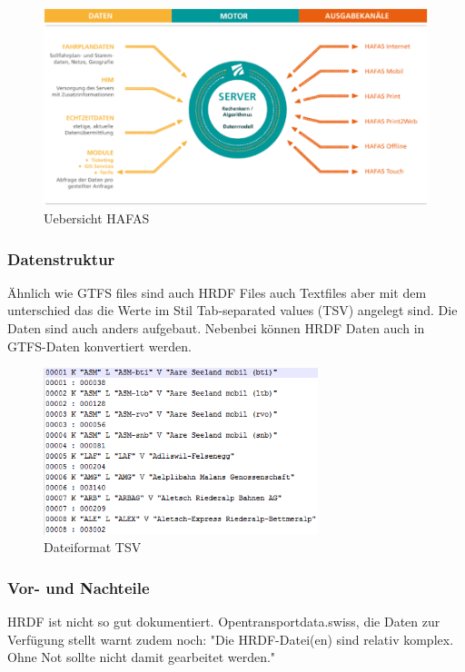 \documentclass[a4paper,12pt]{scrartcl}
\begin{document}


\begin{figure}[]
	\centering
	\includegraphics[scale=0.75]{img/HAFAS.png}
	\caption{Uebersicht HAFAS \cite{haconUebersicht}}
	\label{fig:hafas-uebersicht}
\end{figure}



\subsubsection{Datenstruktur}
\label{sec:hrdf-datenstrukur}
Ähnlich wie GTFS files sind auch HRDF Files auch Textfiles aber mit dem unterschied das die Werte im Stil Tab-separated values (TSV) angelegt sind. Die Daten sind auch anders aufgebaut.
Nebenbei können HRDF Daten auch in GTFS-Daten konvertiert werden.
\begin{figure}[]
	\centering
	\includegraphics[width=8cm]{img/bsptsv.png}
	\caption{Dateiformat TSV}
	\label{fig:hrdf-dateiformat}
\end{figure}


\subsubsection{Vor- und Nachteile}	
\label{sec:hrdf-vornachteile}
HRDF ist nicht so gut dokumentiert. Opentransportdata.swiss, die Daten zur Verfügung stellt warnt zudem noch: "Die HRDF-Datei(en) sind relativ komplex. Ohne Not sollte nicht damit gearbeitet werden."\cite{opentransporthrdf}
\end{document}

